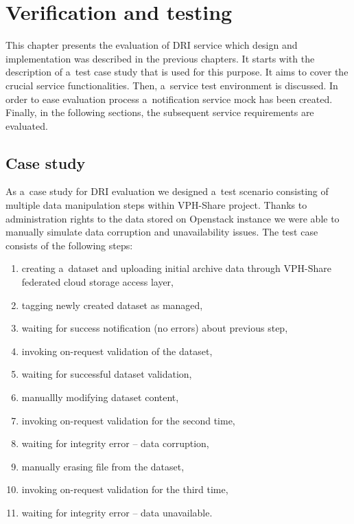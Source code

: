 \chapter{Verification and testing}
\label{cha:testing}

This chapter presents the evaluation of DRI service which design and implementation
was described in the previous chapters. It starts with the description of a~test case
study that is used for this purpose. It aims to cover the crucial service functionalities. Then, a~service
test environment is discussed. In order to ease evaluation process a~notification service
mock has been created. Finally, in the following sections, the subsequent service requirements
are evaluated.


\section{Case study}
\label{case-study}
As a~case study for DRI evaluation we designed a~test scenario consisting of multiple
data manipulation steps within VPH-Share project. Thanks to administration rights to the
data stored on Openstack instance we were able to manually simulate data corruption and
unavailability issues. The test case consists of the following steps:

\begin{enumerate}
\item creating a~dataset and uploading initial archive data through VPH-Share federated cloud
storage access layer,
\item tagging newly created dataset as managed,
\item waiting for success notification (no errors) about previous step,
\item invoking on-request validation of the dataset,
\item waiting for successful dataset validation,
\item manuallly modifying dataset content,
\label{manual-modification}
\item invoking on-request validation for the second time,
\item waiting for integrity error -- data corruption,
\item manually erasing file from the dataset,
\item invoking on-request validation for the third time,
\item waiting for integrity error -- data unavailable. 
\end{enumerate}

